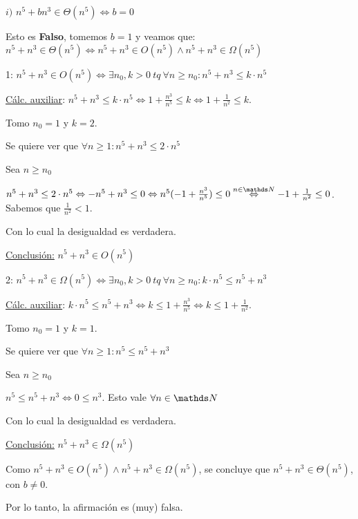 \documentclass[10pt,a4paper]{article}
\begin{document}
\demoline
\demoline
\par $i)$ \ensuremath{n^5 + bn^3 \in \Theta(n^5) \Leftrightarrow b = 0}
\demoline
\begin{groupIzq}{2.5em}
  \par Esto es \textbf{Falso}, tomemos \ensuremath{b = 1} y veamos que: \ensuremath{n^5 + n^3 \in \Theta(n^5) \Leftrightarrow n^5 + n^3 \in O(n^5) \land n^5 + n^3 \in \Omega(n^5)}
  \par 1: \ensuremath{n^5 + n^3 \in O(n^5) \Leftrightarrow \exists n_0, k > 0\ tq\ \forall n \geq n_0: n^5 + n^3 \leq k \cdot n^5}
  \begin{groupIzq}{1em}
    \par \underline{Cálc. auxiliar}: \ensuremath{n^5 + n^3 \leq k \cdot n ^5 \Leftrightarrow 1 + \frac{n^3}{n^5} \leq k \Leftrightarrow 1 + \frac{1}{n^2} \leq k}.
    \par Tomo \ensuremath{n_0 = 1} y \ensuremath{k = 2}.
    \par Se quiere ver que \ensuremath{\forall n \geq 1: n^5 + n^3 \leq 2 \cdot n^5}
    \par Sea \ensuremath{n \geq n_0}
    \par \ensuremath{n^5 + n^3 \leq 2 \cdot n^5 \Leftrightarrow -n^5 + n^3 \leq 0 \Leftrightarrow n^5(-1 + \frac{n^3}{n^5}) \leq 0 \overset{n \in \nat}{\Leftrightarrow} -1 + \frac{1}{n^2} \leq 0}. Sabemos que \ensuremath{\frac{1}{n^2} < 1}.
    \par Con lo cual la desigualdad es verdadera.
    \par \underline{Conclusión:} \ensuremath{n^5 + n^3 \in O(n^5)} 
  \end{groupIzq}
  \par 2: \ensuremath{n^5 + n^3 \in \Omega(n^5) \Leftrightarrow \exists n_0, k > 0\ tq\ \forall n \geq n_0: k \cdot n^5 \leq n^5 + n^3}
  \begin{groupIzq}{1em}
    \par \underline{Cálc. auxiliar}: \ensuremath{k \cdot n ^5 \leq n^5 + n^3 \Leftrightarrow k \leq 1 + \frac{n^3}{n^5} \Leftrightarrow k \leq 1 + \frac{1}{n^2}}.
    \par Tomo \ensuremath{n_0 = 1} y \ensuremath{k = 1}.
    \par Se quiere ver que \ensuremath{\forall n \geq 1: n^5 \leq n^5 + n^3}
    \par Sea \ensuremath{n \geq n_0}
    \par \ensuremath{n^5 \leq n^5 + n^3 \Leftrightarrow 0 \leq n^3}. Esto vale \ensuremath{\forall n \in \nat}
    \par Con lo cual la desigualdad es verdadera.
    \par \underline{Conclusión:} \ensuremath{n^5 + n^3 \in \Omega(n^5)} 
  \end{groupIzq}
  \par Como \ensuremath{n^5 + n^3 \in O(n^5) \land n^5 + n^3 \in \Omega(n^5)}, se concluye que \ensuremath{n^5 + n^3 \in \Theta(n^5)}, con \ensuremath{b \neq 0}.
  \par Por lo tanto, la afirmación es (muy) falsa.
\end{groupIzq}
\newpage
\end{document}
